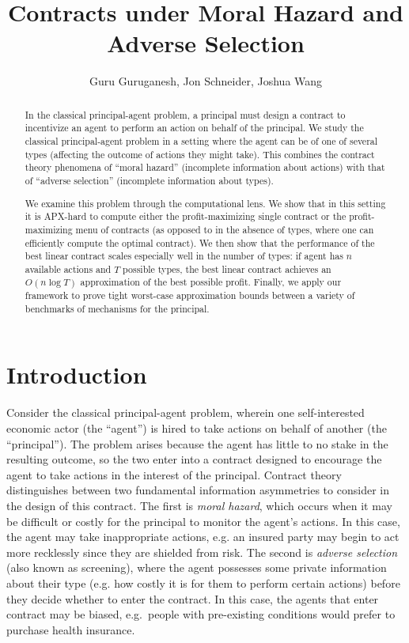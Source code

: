 \documentclass{article}
\title{Contracts under Moral Hazard and Adverse Selection}
\author[1]{Guru Guruganesh, Jon Schneider, Joshua Wang }
\affil[1]{Google Research \footnote{ \{gurug,jschnei,joshuawang\}@google.com}}
\begin{document}
\maketitle

\begin{abstract}
In the classical principal-agent problem, a principal must design a contract to incentivize an agent to perform an action on behalf of the principal. We study the classical principal-agent problem in a setting where the agent can be of one of several types (affecting the outcome of actions they might take). This combines the contract theory phenomena of ``moral hazard'' (incomplete information about actions) with that of ``adverse selection'' (incomplete information about types). 

We examine this problem through the computational lens. We show that in this setting it is APX-hard to compute either the profit-maximizing single contract or the profit-maximizing menu of contracts (as opposed to in the absence of types, where one can efficiently compute the optimal contract). We then show that the performance of the best linear contract scales especially well in the number of types: if agent has $n$ available actions and $T$ possible types, the best linear contract achieves an $O(n\log T)$ approximation of the best possible profit. Finally, we apply our framework to prove tight worst-case approximation bounds between a variety of benchmarks of mechanisms for the principal.
\end{abstract}

\thispagestyle{empty}

\pagebreak

\clearpage
\setcounter{page}{1}

\section{Introduction}
\label{sec:intro}

Consider the classical principal-agent problem, wherein one self-interested economic actor (the ``agent'') is hired to take actions on behalf of another (the ``principal''). The problem arises because the agent has little to no stake in the resulting outcome, so the two enter into a contract designed to encourage the agent to take actions in the interest of the principal. Contract theory distinguishes between two fundamental information asymmetries to consider in the design of this contract. The first is \emph{moral hazard}, which occurs when it may be difficult or costly for the principal to monitor the agent's actions. In this case, the agent may take inappropriate actions, e.g. an insured party may begin to act more recklessly since they are shielded from risk. The second is \emph{adverse selection} (also known as screening), where the agent possesses some private information about their type (e.g. how costly it is for them to perform certain actions) before they decide whether to enter the contract. In this case, the agents that enter contract may be biased, e.g.~people with pre-existing conditions would prefer to purchase health insurance.
\end{document}
